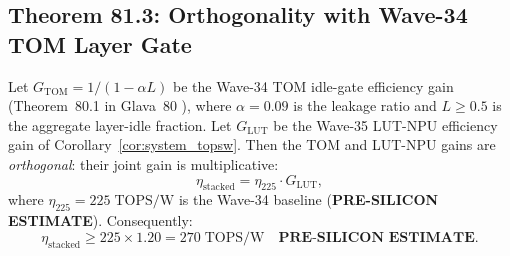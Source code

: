 \subsection{Theorem 81.3: Orthogonality with Wave-34 TOM Layer Gate}

\begin{theorem}
\label{thm:orthogonality_w35}
Let $G_{\mathrm{TOM}} = 1/(1 - \alpha L)$ be the Wave-34 TOM idle-gate
efficiency gain (Theorem~80.1 in Glava~80 \cite{glava80_tom_layer_gate}),
where $\alpha = 0.09$ is the leakage ratio and $L \geq 0.5$ is the aggregate
layer-idle fraction.  Let $G_{\mathrm{LUT}}$ be the Wave-35 LUT-NPU efficiency
gain of Corollary~\ref{cor:system_topsw}.  Then the TOM and LUT-NPU gains
are \emph{orthogonal}: their joint gain is multiplicative:
\[
  \eta_{\mathrm{stacked}} = \eta_{225} \cdot G_{\mathrm{LUT}},
\]
where $\eta_{225} = 225\;\mathrm{TOPS/W}$ is the Wave-34 baseline
(\textbf{PRE-SILICON ESTIMATE}).  Consequently:
\[
  \eta_{\mathrm{stacked}} \geq 225 \times 1.20 = 270\;\mathrm{TOPS/W}
  \quad \textbf{PRE-SILICON ESTIMATE.}
\]
\end{theorem}

